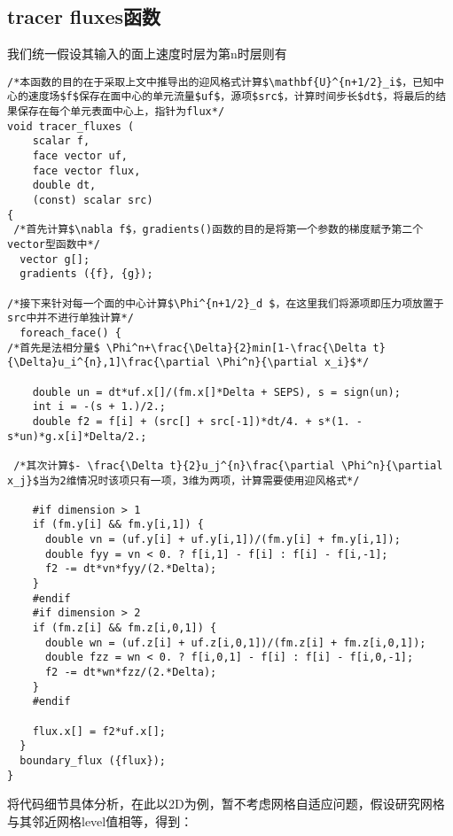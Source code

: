 \documentclass[lang=cn,11pt,a4paper]{elegantpaper}
\begin{document}
\subsection{tracer fluxes函数}\label{sec:tracer}
我们统一假设其输入的面上速度时层为第n时层则有
\begin{verbatim}
/*本函数的目的在于采取上文中推导出的迎风格式计算$\mathbf{U}^{n+1/2}_i$，已知中心的速度场$f$保存在面中心的单元流量$uf$，源项$src$，计算时间步长$dt$，将最后的结果保存在每个单元表面中心上，指针为flux*/
void tracer_fluxes (
    scalar f,
    face vector uf,
    face vector flux,
    double dt,
    (const) scalar src)
{
 /*首先计算$\nabla f$，gradients()函数的目的是将第一个参数的梯度赋予第二个vector型函数中*/ 
  vector g[];
  gradients ({f}, {g});

/*接下来针对每一个面的中心计算$\Phi^{n+1/2}_d $，在这里我们将源项即压力项放置于src中并不进行单独计算*/
  foreach_face() {
/*首先是法相分量$ \Phi^n+\frac{\Delta}{2}min[1-\frac{\Delta t}{\Delta}u_i^{n},1]\frac{\partial \Phi^n}{\partial x_i}$*/

    double un = dt*uf.x[]/(fm.x[]*Delta + SEPS), s = sign(un);
    int i = -(s + 1.)/2.;
    double f2 = f[i] + (src[] + src[-1])*dt/4. + s*(1. - s*un)*g.x[i]*Delta/2.;

 /*其次计算$- \frac{\Delta t}{2}u_j^{n}\frac{\partial \Phi^n}{\partial x_j}$当为2维情况时该项只有一项，3维为两项，计算需要使用迎风格式*/

    #if dimension > 1
    if (fm.y[i] && fm.y[i,1]) {
      double vn = (uf.y[i] + uf.y[i,1])/(fm.y[i] + fm.y[i,1]);
      double fyy = vn < 0. ? f[i,1] - f[i] : f[i] - f[i,-1];
      f2 -= dt*vn*fyy/(2.*Delta);
    }
    #endif
    #if dimension > 2
    if (fm.z[i] && fm.z[i,0,1]) {
      double wn = (uf.z[i] + uf.z[i,0,1])/(fm.z[i] + fm.z[i,0,1]);
      double fzz = wn < 0. ? f[i,0,1] - f[i] : f[i] - f[i,0,-1];
      f2 -= dt*wn*fzz/(2.*Delta);
    }
    #endif

    flux.x[] = f2*uf.x[];
  }
  boundary_flux ({flux});
}
\end{verbatim}
将代码细节具体分析，在此以2D为例，暂不考虑网格自适应问题，假设研究网格与其邻近网格level值相等，得到：\par
\begin{center}
\end{center}
\end{document}
